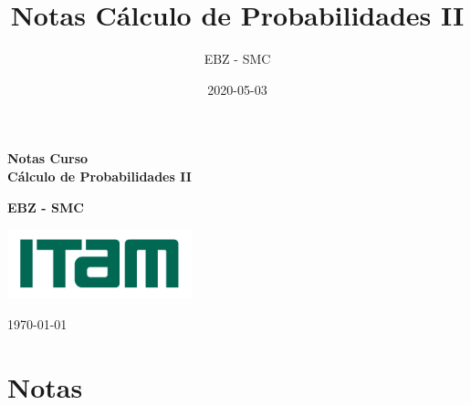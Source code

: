 \documentclass[]{book}
\title{Notas Cálculo de Probabilidades II}
\author{EBZ - SMC}
\date{2020-05-03}
\begin{document}
\maketitle


\begin{titlepage}
    \begin{center}
    	
    	\vspace*{1cm} 
   
        

    \colorbox{antiflashwhite}{
	  \parbox[t]{1.0\linewidth}{
		\centering \fontsize{30pt}{40pt}\selectfont %
		
		
		\vspace{1cm}
		{ \bfseries Notas Curso } \\
		\vspace{1cm}
		{ \bfseries Cálculo de Probabilidades II} \\
    \vspace*{1cm} 	
		
	}
}        
        
     \vspace{5cm}
     {\bfseries EBZ - SMC} \\
		  \vspace{1cm}
	
	
	   {\centering \large 
      \medskip
      \includegraphics[width = 0.4\textwidth]{logos/itam.png} \\
      }
    
     
     
     \vspace{1cm}
     
     {\centering \LARGE 
     \today \\
     }

    \vfill
        
    \end{center}
\end{titlepage}


\vspace{1cm}

{
\setcounter{tocdepth}{1}
\tableofcontents
}
\hypertarget{notas}{%
\chapter*{Notas}\label{notas}}
\end{document}

